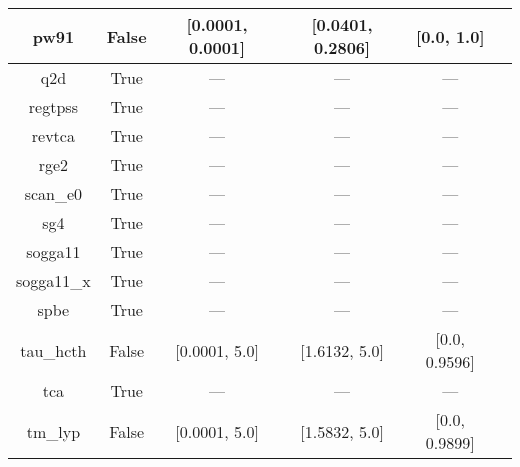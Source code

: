 \begin{tabular}{|c|c|c|c|c|l|}
          pw91 &                 False & [0.0001, 0.0001] & [0.0401, 0.2806] &     [0.0, 1.0] &          \cite{Perdew1991,Perdew1992_6671,Perdew1992_6671_err} \\ \hline
           q2d &                  True &              --- &              --- &            --- &                                       \cite{Chiodo2012_126402} \\ \hline
       regtpss &                  True &              --- &              --- &            --- &                                       \cite{Perdew2009_026403} \\ \hline
        revtca &                  True &              --- &              --- &            --- &                                        \cite{Tognetti2008_536} \\ \hline
          rge2 &                  True &              --- &              --- &            --- &                                      \cite{Ruzsinszky2009_763} \\ \hline
      scan\_e0 &                  True &              --- &              --- &            --- &                                          \cite{Sun2015_036402} \\ \hline
           sg4 &                  True &              --- &              --- &            --- &                                   \cite{Constantin2016_045126} \\ \hline
       sogga11 &                  True &              --- &              --- &            --- &                                       \cite{Peverati2011_1991} \\ \hline
    sogga11\_x &                  True &              --- &              --- &            --- &                                     \cite{Peverati2011_191102} \\ \hline
          spbe &                  True &              --- &              --- &            --- &                                        \cite{Swart2009_094103} \\ \hline
     tau\_hcth &                 False &    [0.0001, 5.0] &    [1.6132, 5.0] &  [0.0, 0.9596] &                                          \cite{Boese2002_9559} \\ \hline
           tca &                  True &              --- &              --- &            --- &                                     \cite{Tognetti2008_034101} \\ \hline
       tm\_lyp &                 False &    [0.0001, 5.0] &    [1.5832, 5.0] &  [0.0, 0.9899] &                                      \cite{Thakkar2009_134109} \\ \hline

\end{tabular}
